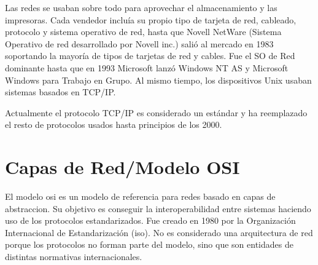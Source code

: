 \documentclass[a4paper, 11pt]{report} %
\begin{document}
Las redes se usaban sobre todo para aprovechar el almacenamiento y las impresoras. Cada vendedor incluía su propio tipo de tarjeta de red, cableado, protocolo y sistema operativo de red, hasta que Novell NetWare (Sistema Operativo de red desarrollado por Novell inc.) salió al mercado en 1983 soportando la mayoría de tipos de tarjetas de red y cables. Fue el SO de Red dominante hasta que en 1993 Microsoft lanzó Windows NT AS y Microsoft Windows para Trabajo en Grupo. Al mismo tiempo, los dispositivos Unix usaban sistemas basados en TCP/IP.

Actualmente el protocolo TCP/IP es considerado un estándar y ha reemplazado el resto de protocolos usados hasta principios de los 2000.

\newpage

\section{Capas de Red/Modelo OSI}
El modelo \acrshort{osi} es un modelo de referencia para redes basado en \gls{capas de abstraccion}.
Su objetivo es conseguir la interoperabilidad entre sistemas haciendo uso de los protocolos estandarizados. Fue creado en 1980 por la Organización Internacional de Estandarización (\acrshort{iso}). No es considerado una arquitectura de red porque los protocolos no forman parte del modelo, sino que son entidades de distintas normativas internacionales.
\vspace*{5pt}
\end{document}
